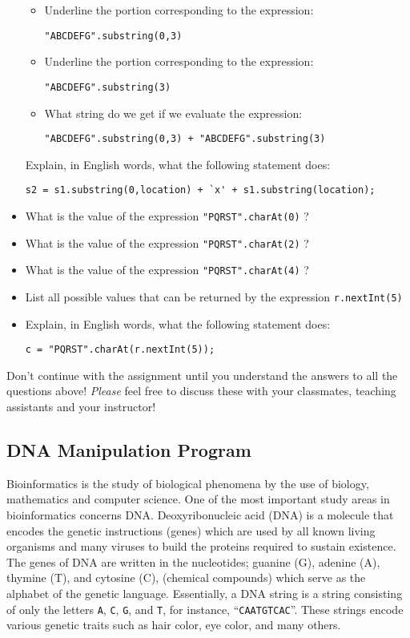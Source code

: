 \begin{itemize}
\begin{itemize}
\item
Underline the portion corresponding to the
expression:
\begin{center}
\verb$"ABCDEFG".substring(0,3)$
\end{center}
\item
Underline the portion corresponding to the
expression:
\begin{center}
\verb$"ABCDEFG".substring(3)$
\end{center}
\item
What string do we get if we evaluate the expression:
\begin{center}
\verb$"ABCDEFG".substring(0,3) + "ABCDEFG".substring(3)$
\end{center}
\end{itemize}
Explain, in English words, what the following statement does:
\begin{center}
\verb$s2 = s1.substring(0,location) + `x' + s1.substring(location);$
\end{center}
\item
What is the value of the expression \verb$"PQRST".charAt(0)$ ?
\item
What is the value of the expression \verb$"PQRST".charAt(2)$ ?
\item
What is the value of the expression \verb$"PQRST".charAt(4)$ ?
\item
List all possible values that can be returned by the expression
\verb$r.nextInt(5)$
\item
Explain, in English words, what the following statement does:
\begin{center}
\verb$c = "PQRST".charAt(r.nextInt(5));$
\end{center}
\end{itemize}
Don't continue with the assignment until you understand the answers to all the
questions above! {\em Please} feel free to discuss these with your
classmates, teaching assistants and your instructor!

\vspace{-0.05in}
\subsection*{DNA Manipulation Program}
\vspace{-0.05in}
Bioinformatics is the study of biological phenomena by the use of biology, mathematics and computer science. One of the most important study areas in bioinformatics concerns DNA. Deoxyribonucleic acid (DNA) is a molecule that encodes the genetic instructions (genes) which are used by all known living organisms and many viruses to build the proteins required to sustain existence. The genes of DNA are written in the nucleotides; guanine (G), adenine (A), thymine (T), and cytosine (C), (chemical compounds) which serve as the alphabet of the genetic language.
Essentially, a DNA string is a string consisting of only the letters {\tt A}, {\tt C}, {\tt G}, and {\tt T}, for instance, ``{\tt CAATGTCAC}''. These strings encode
various genetic traits such as hair color, eye color, and many others.

